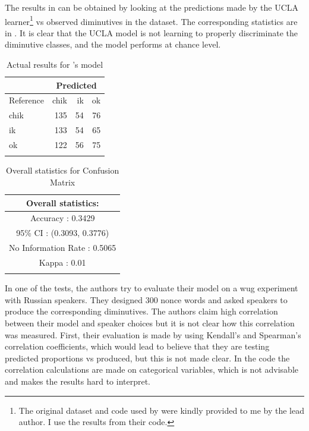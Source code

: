 The results in  can be obtained by looking at the predictions made by the UCLA learner\footnote{The original dataset and code used by \textcite{Gouskova.2015} were kindly provided to me by the lead author. I use the results from their code.} vs observed diminutives in the dataset. The corresponding statistics are in . It is clear that the UCLA model is not learning to properly discriminate the diminutive classes, and the model performs at chance level.

\begin{table}
  \centering
  \begin{tabular}{lrrr}
    \lsptoprule
    & \multicolumn{3}{c}{Predicted} \\
    \midrule
    Reference & chik & ik & ok                \\
    chik      & 135  & 54 & 76                \\
    ik        & 133  & 54 & 65                \\
    ok        & 122  & 56 & 75                \\
    \lspbottomrule
  \end{tabular}
  \caption{Actual results for \textcite{Gouskova.2015}'s model}\label{tab:test-gkn-model}
\end{table}

\begin{table}
  \centering
  \begin{tabular}{c}
    \lsptoprule
    Overall statistics:          \\
    \midrule
    Accuracy : 0.3429\\
    95\% CI : (0.3093, 0.3776)\\
    No Information Rate : 0.5065\\
    Kappa : 0.01\\
    \lspbottomrule
  \end{tabular}
  \caption{Overall statistics for Confusion Matrix }\label{tab:test-gkn-stats}
\end{table}

In one of the tests, the authors try to evaluate their model on a wug experiment with Russian speakers. They designed 300 nonce words and asked speakers to produce the corresponding diminutives. The authors claim high correlation between their model and speaker choices but it is not clear how this correlation was measured. First, their evaluation is made by using Kendall's and Spearman's correlation coefficients, which would lead to believe that they are testing predicted proportions vs produced, but this is not made clear. In the code the correlation calculations are made on categorical variables, which is not advisable and makes the results hard to interpret.


